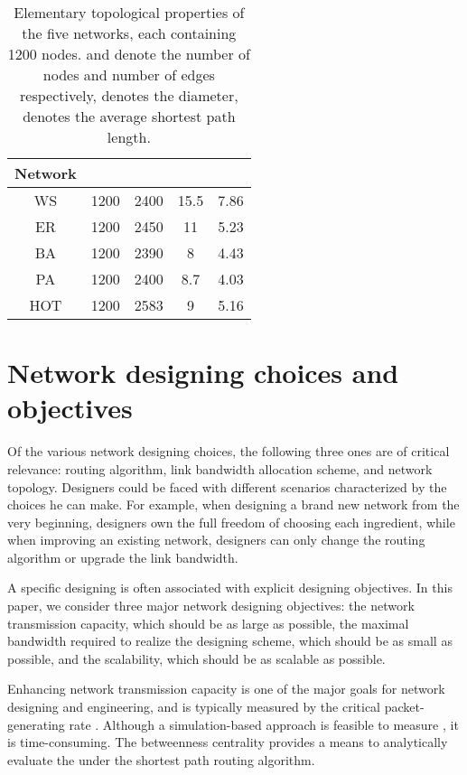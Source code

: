 \documentclass[journal]{IEEEtran}
\begin{document}
{\begin{table}[!t]
\renewcommand{\arraystretch}{1.3}
\centering
 \caption{Elementary topological properties of the five
networks, each containing 1200 nodes.  and  denote the number
of nodes and number of edges respectively,  denotes the diameter,
 denotes the average shortest path length. } \label{basic_info}
\begin{tabular}{ccccc}
\hline Network &  &  &  & 
\\
\hline\hline
WS & 1200 & 2400 & 15.5 & 7.86 \\
ER & 1200 & 2450 & 11 & 5.23  \\
BA & 1200 & 2390 & 8 & 4.43  \\
PA & 1200 & 2400 & 8.7 & 4.03  \\
HOT & 1200 & 2583 & 9 & 5.16  \\
  \hline
\end{tabular}


\end{table}

\section{Network designing choices and
objectives}\label{designing-objective-choice}
Of the various network designing choices, the following three ones
are of critical relevance: routing algorithm, link bandwidth
allocation scheme, and network topology. Designers could be faced
with different scenarios characterized by the choices he can make.
For example, when designing a brand new network from the very
beginning, designers own the full freedom of choosing each
ingredient, while when improving an existing network, designers can
only change the routing algorithm or upgrade the link bandwidth.

A specific designing is often associated with explicit designing
objectives. In this paper, we consider three major network designing
objectives: the network transmission capacity, which should be as
large as possible, the maximal bandwidth required to realize the
designing scheme, which should be as small as possible, and the
scalability, which should be as scalable as possible.

Enhancing network transmission capacity is one of the major goals
for network designing and engineering, and is typically measured by
the critical packet-generating rate  \cite{efficient-routing,
edge-deletion, onset-traffic-congestion,Danila06}. Although a
simulation-based approach is feasible to measure , it is
time-consuming. The betweenness centrality provides a means to
analytically evaluate the  under the shortest path routing
algorithm.

}
\end{document}
